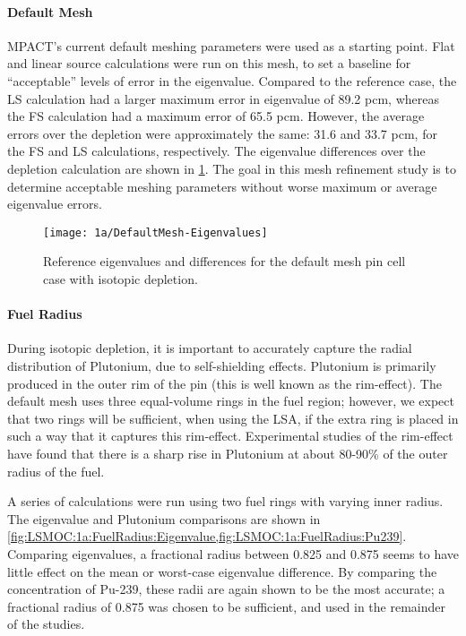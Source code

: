 {{{      \paragraph{Default Mesh}{
        MPACT's current default meshing parameters were used as a starting point.
        Flat and linear source calculations were run on this mesh, to set a baseline for ``acceptable'' levels of error in the eigenvalue.
        Compared to the reference case, the \ac{LS} calculation had a larger maximum error in eigenvalue of 89.2 \ac{pcm}, whereas the \ac{FS} calculation had a maximum error of 65.5 \ac{pcm}.
        However, the average errors over the depletion were approximately the same: 31.6 and 33.7 \ac{pcm}, for the \ac{FS} and \ac{LS} calculations, respectively.
        The eigenvalue differences over the depletion calculation are shown in \cref{fig:LSMOC:1a:DefaultMesh:Eigenvalue}.
        The goal in this mesh refinement study is to determine acceptable meshing parameters without worse maximum or average eigenvalue errors.

        \begin{figure}
            \centering
            \texttt{[image: 1a/DefaultMesh-Eigenvalues]}
            \caption{Reference eigenvalues and differences for the default mesh pin cell case with isotopic depletion. \label{fig:LSMOC:1a:DefaultMesh:Eigenvalue}}
        \end{figure}
      }
      \paragraph{Fuel Radius}{
        During isotopic depletion, it is important to accurately capture the radial distribution of Plutonium, due to self-shielding effects.
        Plutonium is primarily produced in the outer rim of the pin (this is well known as the rim-effect).
        The default mesh uses three equal-volume rings in the fuel region; however, we expect that two rings will be sufficient, when using the \ac{LSA}, if the extra ring is placed in such a way that it captures this rim-effect.
        Experimental studies of the rim-effect \cite{Lassmann1994} have found that there is a sharp rise in Plutonium at about 80-90\% of the outer radius of the fuel.

        A series of calculations were run using two fuel rings with varying inner radius.
        The eigenvalue and Plutonium comparisons are shown in \cref{fig:LSMOC:1a:FuelRadius:Eigenvalue,fig:LSMOC:1a:FuelRadius:Pu239}.
        Comparing eigenvalues, a fractional radius between 0.825 and 0.875 seems to have little effect on the mean or worst-case eigenvalue difference.
        By comparing the concentration of Pu-239, these radii are again shown to be the most accurate; a fractional radius of 0.875 was chosen to be sufficient, and used in the remainder of the studies.

}}}}
